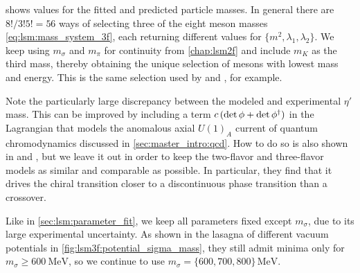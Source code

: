  shows values for the fitted and predicted particle masses.
In general there are $8!/3!5! = 56$ ways of selecting three of the eight meson masses \eqref{eq:lsm:mass_system_3f},
each returning different values for $\{m^2,\lambda_1,\lambda_2\}$.
We keep using $m_\sigma$ and $m_\pi$ for continuity from \cref{chap:lsm2f}
and include $m_K$ as the third mass, thereby obtaining the unique selection of mesons with lowest mass and energy.
This is the same selection used by \cite{ref:lsm3f} and \cite{ref:lsm3f_details}, for example.

Note the particularly large discrepancy between the modeled and experimental $\eta'$ mass.
This can be improved by including a term $c \, (\operatorname{det}{\phi} + \operatorname{det}{\phi^\dagger})$ in the Lagrangian
that models the anomalous axial $U(1)_A$ current of quantum chromodynamics discussed in \cref{sec:master_intro:qcd}.
How to do so is also shown in \cite{ref:lsm3f} and \cite{ref:lsm3f_details},
but we leave it out in order to keep the two-flavor and three-flavor models as similar and comparable as possible.
In particular, they find that it drives the chiral transition closer to a discontinuous phase transition than a crossover.

Like in \cref{sec:lsm:parameter_fit},
we keep all parameters fixed except $m_\sigma$, due to its large experimental uncertainty.
As shown in the lasagna of different vacuum potentials in \cref{fig:lsm3f:potential_sigma_mass},
they still admit minima only for $m_\sigma \geq \SI{600}{\mega\electronvolt}$,
so we continue to use $m_\sigma=\{600,700,800\} \, \si{\mega\electronvolt}$.

